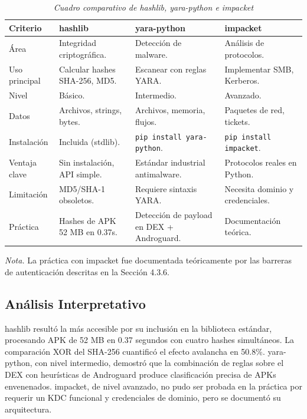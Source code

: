 \documentclass[12pt,a4paper]{article}
\begin{document}
\begin{table}[H]
\centering\footnotesize
\begin{threeparttable}
\caption{\textit{Cuadro comparativo de hashlib, yara-python e impacket}}
\begin{tabular}{p{2.5cm}p{3.5cm}p{3.5cm}p{3.5cm}}
\toprule
\textbf{Criterio} & \textbf{hashlib} & \textbf{yara-python} & \textbf{impacket} \\
\midrule
Área & Integridad criptográfica. & Detección de malware. & Análisis de protocolos. \\
Uso principal & Calcular hashes SHA-256, MD5. & Escanear con reglas YARA. & Implementar SMB, Kerberos. \\
Nivel & Básico. & Intermedio. & Avanzado. \\
Datos & Archivos, strings, bytes. & Archivos, memoria, flujos. & Paquetes de red, tickets. \\
Instalación & Incluida (stdlib). & \texttt{pip install yara-python}. & \texttt{pip install impacket}. \\
Ventaja clave & Sin instalación, API simple. & Estándar industrial antimalware. & Protocolos reales en Python. \\
Limitación & MD5/SHA-1 obsoletos. & Requiere sintaxis YARA. & Necesita dominio y credenciales. \\
Práctica & Hashes de APK 52 MB en 0.37s. & Detección de payload en DEX + Androguard. & Documentación teórica. \\
\bottomrule
\end{tabular}
\begin{tablenotes}
\item \textit{Nota.} La práctica con impacket fue documentada teóricamente por las barreras de autenticación descritas en la Sección 4.3.6.
\end{tablenotes}
\end{threeparttable}
\end{table}

\subsection{Análisis Interpretativo}

hashlib resultó la más accesible por su inclusión en la biblioteca
estándar, procesando APK de 52 MB en 0.37 segundos con cuatro hashes
simultáneos. La comparación XOR del SHA-256 cuantificó el efecto
avalancha en 50.8\%. yara-python, con nivel intermedio, demostró que
la combinación de reglas sobre el DEX con heurísticas de Androguard
produce clasificación precisa de APKs envenenados. impacket, de nivel
avanzado, no pudo ser probada en la práctica por requerir un KDC
funcional y credenciales de dominio, pero se documentó su arquitectura.
\end{document}
